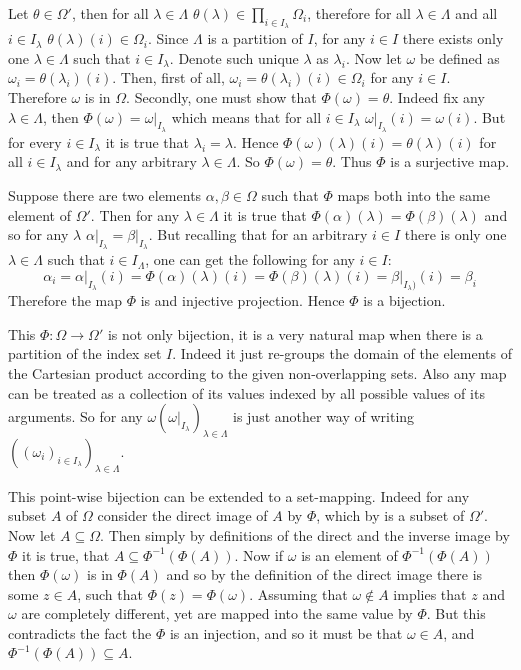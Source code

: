 \documentclass[a4paper]{article}
\begin{document}
Let $\theta \in \Omega'$, then for all $\lambda \in \Lambda$ $\theta(\lambda) \in \prod_{i \in I_\lambda} \Omega_i$, therefore for all $\lambda \in \Lambda$ and all $i \in I_\lambda$ $\theta(\lambda)(i) \in \Omega_i$. Since $\Lambda$ is a partition of $I$, for any $i \in I$ there exists only one $\lambda \in \Lambda$ such that $i \in I_\lambda$. Denote such unique $\lambda$ as $\lambda_i$. Now let $\omega$ be defined as $\omega_i = \theta(\lambda_i)(i)$. Then, first of all, $\omega_i = \theta(\lambda_i)(i) \in \Omega_i$ for any $i \in I$. Therefore $\omega$ is in $\Omega$. Secondly, one must show that $\Phi(\omega) = \theta$. Indeed fix any $\lambda \in \Lambda$, then $\Phi(\omega) = \omega\vert_{I_\lambda}$ which means that for all $i \in I_\lambda$ $\omega\vert_{I_\lambda}(i) = \omega(i)$. But for every $i \in I_\lambda$ it is true that $\lambda_i = \lambda$. Hence $\Phi(\omega)(\lambda)(i) = \theta(\lambda)(i)$ for all $i \in I_\lambda$ and for any arbitrary $\lambda \in \Lambda$. So $\Phi(\omega) = \theta$. Thus $\Phi$ is a surjective map.

Suppose there are two elements $\alpha, \beta \in \Omega$ such that $\Phi$ maps both into the same element of $\Omega'$. Then for any $\lambda \in \Lambda$ it is true that $\Phi(\alpha)(\lambda) = \Phi(\beta)(\lambda)$ and so for any $\lambda$ $\alpha\vert_{I_\lambda}=\beta\vert_{I_\lambda}$. But recalling that for an arbitrary $i \in I$ there is only one $\lambda \in \Lambda$ such that $i \in I_\Lambda$, one can get the following for any $i \in I$: \[\alpha_i = \alpha\vert_{I_\lambda}(i) = \Phi(\alpha)(\lambda)(i) = \Phi(\beta)(\lambda)(i) = \beta\vert_{I_\lambda)}(i) = \beta_i\] Therefore the map $\Phi$ is and injective projection. Hence $\Phi$ is a bijection.

This $\Phi:\Omega \to \Omega'$ is not only bijection, it is a very natural map when there is a partition of the index set $I$. Indeed it just re-groups the domain of the elements of the Cartesian product according to the given non-overlapping sets. Also any map can be treated as a collection of its values indexed by all possible values of its arguments. So for any $\omega (\omega\vert_{I_\lambda})_{\lambda \in \Lambda}$ is just another way of writing $((\omega_i)_{i \in I_\lambda})_{\lambda \in \Lambda}$.

This point-wise bijection can be extended to a set-mapping. Indeed for any subset $A$ of $\Omega$ consider the direct image of $A$ by $\Phi$, which by is a subset of $\Omega'$.
Now let $A \subseteq \Omega$. Then simply by definitions of the direct and the inverse image by $\Phi$ it is true, that $A \subseteq \Phi^{-1}(\Phi( A ))$. Now if $\omega$ is an element of $\Phi^{-1}( \Phi(A) )$ then $\Phi(\omega)$ is in $\Phi(A)$ and so by the definition of the direct image there is some $z \in A$, such that $\Phi(z) = \Phi(\omega)$. Assuming that $\omega \notin A$ implies that $z$ and $\omega$ are completely different, yet are mapped into the same value by $\Phi$. But this contradicts the fact the $\Phi$ is an injection, and so it must be that $\omega \in A$, and $\Phi^{-1}( \Phi(A)) \subseteq A$.
\end{document}

